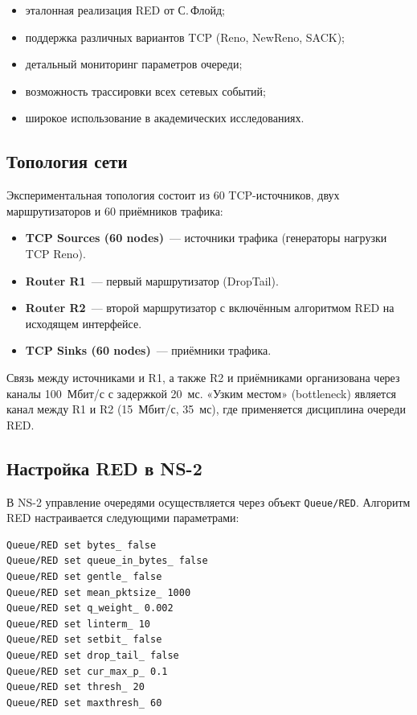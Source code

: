 \documentclass[%
]{ittmm}
\begin{document}
\begin{itemize}
  \item эталонная реализация RED от С.\,Флойд;
  \item поддержка различных вариантов TCP (Reno, NewReno, SACK);
  \item детальный мониторинг параметров очереди;
  \item возможность трассировки всех сетевых событий;
  \item широкое использование в академических исследованиях.
\end{itemize}

\subsection{Топология сети}

Экспериментальная топология состоит из 60 TCP-источников, двух маршрутизаторов и 60 приёмников трафика:

\begin{itemize}
  \item \textbf{TCP Sources (60 nodes)}~--- источники трафика (генераторы нагрузки TCP Reno).
  \item \textbf{Router R1}~--- первый маршрутизатор (DropTail).
  \item \textbf{Router R2}~--- второй маршрутизатор с включённым алгоритмом RED на исходящем интерфейсе.
  \item \textbf{TCP Sinks (60 nodes)}~--- приёмники трафика.
\end{itemize}

Связь между источниками и R1, а также R2 и приёмниками организована через каналы 100~Мбит/с с задержкой 20~мс. «Узким местом» (bottleneck) является канал между R1 и R2 (15~Мбит/с, 35~мс), где применяется дисциплина очереди RED.

\subsection{Настройка RED в NS-2}

В NS-2 управление очередями осуществляется через объект \texttt{Queue/RED}. Алгоритм RED настраивается следующими параметрами:
\begin{verbatim}
Queue/RED set bytes_ false
Queue/RED set queue_in_bytes_ false
Queue/RED set gentle_ false
Queue/RED set mean_pktsize_ 1000
Queue/RED set q_weight_ 0.002
Queue/RED set linterm_ 10
Queue/RED set setbit_ false
Queue/RED set drop_tail_ false
Queue/RED set cur_max_p_ 0.1
Queue/RED set thresh_ 20
Queue/RED set maxthresh_ 60
\end{verbatim}
\end{document}
